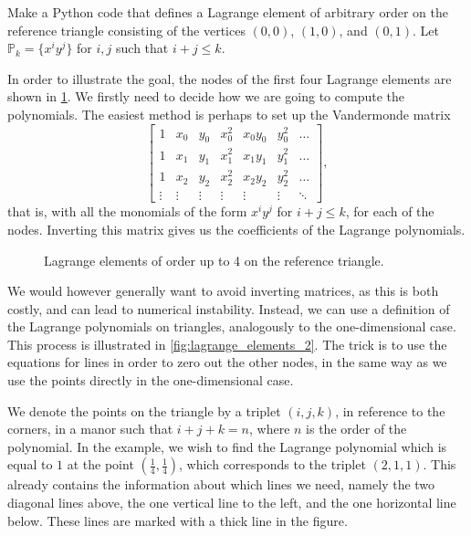 \begin{exercise}
    Make a Python code that defines a Lagrange element of arbitrary order on the reference triangle consisting of the vertices $(0, 0)$, $(1, 0)$, and $(0, 1)$.
    Let $\mathbb{P}_k = \{x^i y^j\}$ for $i,j$ such that $i + j \leq k$.
\end{exercise}

\begin{solution}
    In order to illustrate the goal, the nodes of the first four Lagrange elements are shown in \cref{fig:lagrange_elements_duplicate}.
    We firstly need to decide how we are going to compute the polynomials.
    The easiest method is perhaps to set up the Vandermonde matrix
    \begin{equation*}
        \begin{bmatrix}
            1 & x_0 & y_0 & x_0^2 & x_0 y_0 & y_0^2 & \ldots \\
            1 & x_1 & y_1 & x_1^2 & x_1 y_1 & y_1^2 & \ldots \\
            1 & x_2 & y_2 & x_2^2 & x_2 y_2 & y_2^2 & \ldots \\
            \vdots & \vdots & \vdots & \vdots & \vdots & \vdots & \ddots
        \end{bmatrix},
    \end{equation*}
    that is, with all the monomials of the form $x^i y^j$ for $i + j \leq k$, for each of the nodes.
    Inverting this matrix gives us the coefficients of the Lagrange polynomials.

    \begin{figure}[!h]
        \centering
        
        \caption{Lagrange elements of order up to 4 on the reference triangle.\label{fig:lagrange_elements_duplicate}}
    \end{figure}

    We would however generally want to avoid inverting matrices, as this is both costly, and can lead to numerical instability.
    Instead, we can use a definition of the Lagrange polynomials on triangles, analogously to the one-dimensional case.
    This process is illustrated in \cref{fig:lagrange_elements_2}.
    The trick is to use the equations for lines in order to zero out the other nodes, in the same way as we use the points directly in the one-dimensional case.

    We denote the points on the triangle by a triplet $(i, j, k)$, in reference to the corners, in a manor such that $i + j + k = n$, where $n$ is the order of the polynomial.
    In the example, we wish to find the Lagrange polynomial which is equal to $1$ at the point $(\frac{1}{4}, \frac{1}{4})$, which corresponds to the triplet $(2, 1, 1)$.
    This already contains the information about which lines we need, namely the two diagonal lines above, the one vertical line to the left, and the one horizontal line below.
    These lines are marked with a thick line in the figure.


\end{solution}
